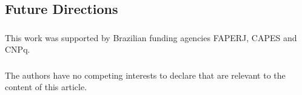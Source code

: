 \documentclass[runningheads]{llncs}
\begin{document}

\subsection{Future Directions}


\begin{credits}
\subsubsection{\ackname}
This work was supported by Brazilian funding agencies FAPERJ, CAPES and CNPq.

\subsubsection{\discintname}
The authors have no competing interests to declare that are relevant to the content of this article.
\end{credits}



\end{document}
